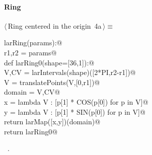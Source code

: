 \documentclass[11pt,oneside]{article}	%
\begin{document}
\paragraph{Ring}
\begin{flushleft} \small \label{scrap7}
\protect{}$\langle\,$Ring centered in the origin\nobreak\ {\footnotesize 4a}$\,\rangle\equiv$
\vspace{-1ex}
\begin{list}{}{} \item
\mbox{}\verb@def larRing(params):@\\
\mbox{}\verb@   r1,r2 = params@\\
\mbox{}\verb@   def larRing0(shape=[36,1]):@\\
\mbox{}\verb@      V,CV = larIntervals(shape)([2*PI,r2-r1])@\\
\mbox{}\verb@      V = translatePoints(V,[0,r1])@\\
\mbox{}\verb@      domain = V,CV@\\
\mbox{}\verb@      x = lambda V : [p[1] * COS(p[0]) for p in V]@\\
\mbox{}\verb@      y = lambda V : [p[1] * SIN(p[0]) for p in V]@\\
\mbox{}\verb@      return larMap([x,y])(domain)@\\
\mbox{}\verb@   return larRing0@\\
\mbox{}\verb@@{\NWsep}
\end{list}
\vspace{-1ex}
\footnotesize\addtolength{\baselineskip}{-1ex}
\begin{list}{}{\setlength{\itemsep}{-\parsep}\setlength{\itemindent}{-\leftmargin}}
\item \NWtxtMacroRefIn\ .
\end{list}
\end{flushleft}
\end{document}

